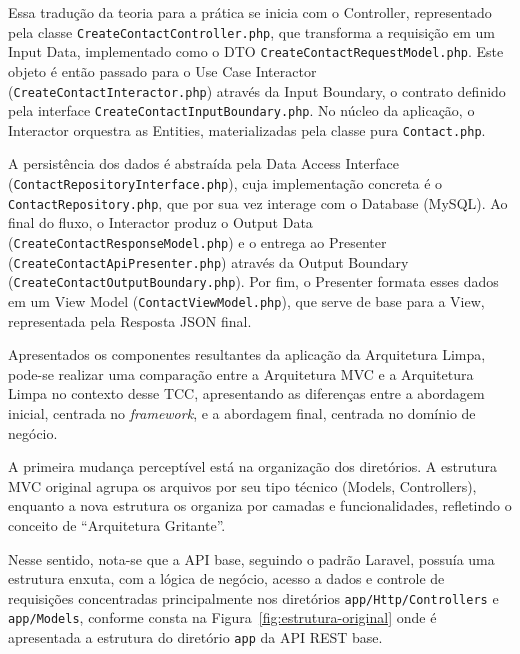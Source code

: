         \par Essa tradução da teoria para a prática se inicia com o Controller, representado pela classe \texttt{CreateContactController.php}, que transforma a requisição em um Input Data, implementado como o DTO \texttt{CreateContactRequestModel.php}. Este objeto é então passado para o Use Case Interactor (\texttt{CreateContactInteractor.php}) através da Input Boundary, o contrato definido pela interface \texttt{CreateContactInputBoundary.php}. No núcleo da aplicação, o Interactor orquestra as Entities, materializadas pela classe pura \texttt{Contact.php}. 
        
        \par A persistência dos dados é abstraída pela Data Access Interface (\texttt{ContactRepositoryInterface.php}), cuja implementação concreta é o \texttt{ContactRepository.php}, que por sua vez interage com o Database (MySQL). Ao final do fluxo, o Interactor produz o Output Data (\texttt{CreateContactResponseModel.php}) e o entrega ao Presenter (\texttt{CreateContactApiPresenter.php}) através da Output Boundary (\texttt{CreateContactOutputBoundary.php}). Por fim, o Presenter formata esses dados em um View Model (\texttt{ContactViewModel.php}), que serve de base para a View, representada pela Resposta JSON final.

        \par Apresentados os componentes resultantes da aplicação da Arquitetura Limpa, pode-se realizar uma comparação entre a Arquitetura MVC e a Arquitetura Limpa no contexto desse TCC, apresentando as diferenças entre a abordagem inicial, centrada no \textit{framework}, e a abordagem final, centrada no domínio de negócio. 
        
        \par A primeira mudança perceptível está na organização dos diretórios. A estrutura MVC original agrupa os arquivos por seu tipo técnico (Models, Controllers), enquanto a nova estrutura os organiza por camadas e funcionalidades, refletindo o conceito de ``Arquitetura Gritante''.
        
        \par Nesse sentido, nota-se que a API base, seguindo o padrão Laravel, possuía uma estrutura enxuta, com a lógica de negócio, acesso a dados e controle de requisições concentradas principalmente nos diretórios \texttt{app/Http/Controllers} e \texttt{app/Models}, conforme consta na Figura~\ref{fig:estrutura-original} onde é apresentada a estrutura do diretório \texttt{app} da API REST base. 


